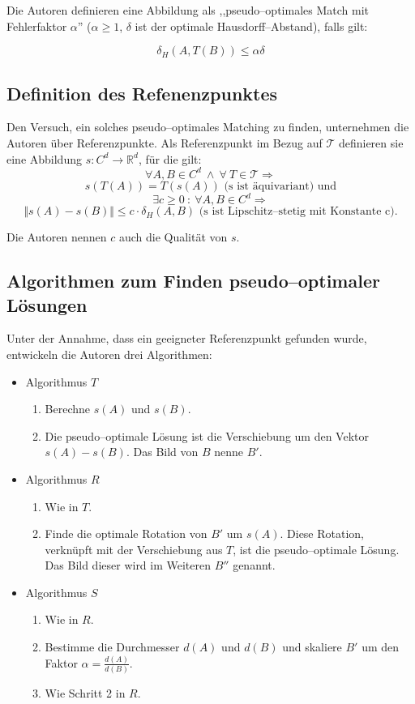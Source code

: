 Die Autoren definieren eine Abbildung als ,,pseudo--optimales Match mit Fehlerfaktor $\alpha$''  ($\alpha\geq 1$, $\delta$ ist der optimale Hausdorff--Abstand), falls gilt:

$$\delta_H(A,T(B))\leq \alpha \delta$$

\subsection{Definition des Refenenzpunktes}

Den Versuch, ein solches pseudo--optimales Matching zu finden, unternehmen die Autoren über Referenzpunkte. Als Referenzpunkt im Bezug auf $\mathcal{T}$ definieren sie eine Abbildung $s:C^d\longrightarrow\mathbb{R}^d$, für die gilt:
$$\forall A, B\in C^d  \:\wedge\: \forall\: T\in\mathcal{T}\Rightarrow$$
$$s(T(A))=T(s(A))\text{ (s ist äquivariant) und}$$
$$\exists c\geq0 \: :\: \forall A, B \in C^d\Rightarrow$$
$$\Vert s(A)-s(B)\Vert\leq c\cdot\delta_H(A,B)\text{ (s ist Lipschitz--stetig mit Konstante c)}.$$

Die Autoren nennen $c$ auch die Qualität von $s$.

\subsection{Algorithmen zum Finden pseudo--optimaler Lösungen}

Unter der Annahme, dass ein geeigneter Referenzpunkt gefunden wurde, entwickeln die Autoren drei Algorithmen:
\begin{itemize}
\item Algorithmus $T$
\begin{enumerate}
\item Berechne $s(A)$ und $s(B)$.
\item Die pseudo--optimale Lösung ist die Verschiebung um den Vektor $s(A)-s(B)$. Das Bild von $B$ nenne $B'$.
\end{enumerate}

\item Algorithmus $R$
\begin{enumerate}
\item Wie in $T$.
\item Finde die optimale Rotation von $B'$ um $s(A)$. Diese Rotation, verknüpft mit der Verschiebung aus $T$, ist die pseudo--optimale Lösung. Das Bild dieser wird im Weiteren $B''$ genannt.

\end{enumerate}
\item Algorithmus $S$
\begin{enumerate}
\item Wie in $R$.
\item Bestimme die Durchmesser $d(A)$ und $d(B)$ und skaliere $B'$ um den Faktor $\alpha =\frac{d(A)}{d(B)}$.
\item Wie Schritt 2 in $R$.
\end{enumerate}
\end{itemize}

